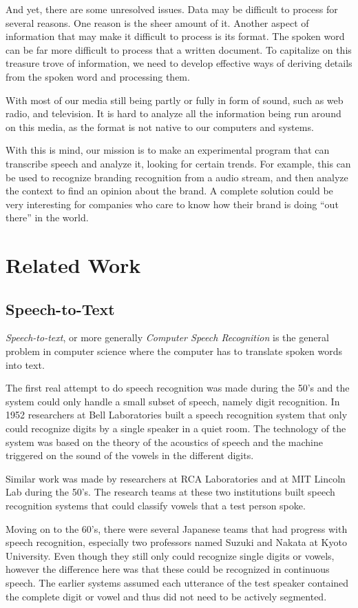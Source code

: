 \documentclass[a4paper,12pt,twoside]{ltxdoc}
\begin{document}
And yet, there are some unresolved issues. Data may be difficult to process for several reasons. One reason is the sheer
amount of it. Another aspect of information that may make it difficult to process is its format. The spoken word can be 
far more difficult to process that a written document. To capitalize on this treasure trove of information, we need
to develop effective ways of deriving details from the spoken word and processing them.

With most of our media still being partly or fully in form of sound, such as web radio, and television.
It is hard to analyze all the information being run around on this media, as the format is not
native to our computers and systems. 

With this is mind, our mission is to make an experimental program that can transcribe speech and analyze it, looking for certain trends.
For example, this can be used to recognize branding recognition from a audio stream, and then analyze the context to find an opinion about the brand.
A complete solution could be very interesting for companies who care to know how their brand is doing ``out there'' in the world.

\section{Related Work}
\subsection{Speech-to-Text}
\emph{Speech-to-text}, or more generally \emph{Computer Speech Recognition} is the general problem in computer science where the computer has to translate spoken words into text.

The first real attempt to do speech recognition was made during the 50's and the system could only handle a small subset of speech, namely digit recognition. In 1952 researchers at Bell Laboratories built a speech recognition system that only could recognize digits by a single speaker in a quiet room. The technology of  the system was based on the theory of the acoustics of speech and the machine triggered on the sound of the vowels in the different digits.

Similar work was made by researchers at RCA Laboratories and at MIT Lincoln Lab during the 50's. The research teams at these two institutions built speech recognition systems that could classify vowels that a test person spoke.

Moving on to the 60's, there were several Japanese teams that had progress with speech recognition, especially two professors named Suzuki and Nakata at Kyoto University. Even though they still only could recognize single digits or vowels, however the difference here was that these could be recognized in continuous speech. The earlier systems assumed each utterance of the test speaker contained the complete digit or vowel and thus did not need to be actively segmented.  
\end{document}
